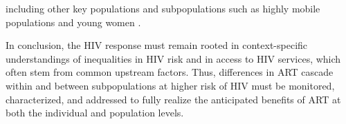 including other key populations and subpopulations such as
highly mobile populations and young women \cite{Camlin2019,Cheuk2020}.
\par
In conclusion, the HIV response must remain rooted in
context-specific understandings of inequalities in HIV risk and in access to HIV services,
which often stem from common upstream factors.
Thus, differences in ART cascade within and between subpopulations at higher risk of HIV
must be monitored, characterized, and addressed
to fully realize the anticipated benefits of ART
at both the individual and population levels.
\enlargethispage{2ex} %
